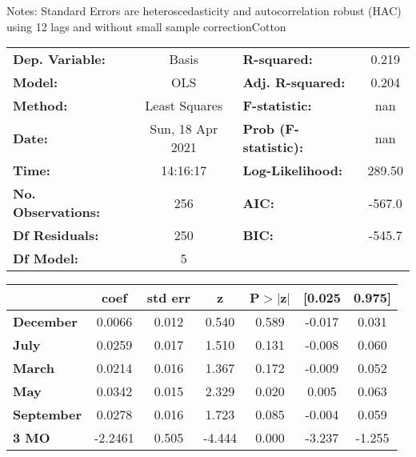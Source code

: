 Notes: \newline
 [1] Standard Errors are heteroscedasticity and autocorrelation robust (HAC) using 12 lags and without small sample correctionCotton\begin{center}
\begin{tabular}{lclc}
\toprule
\textbf{Dep. Variable:}    &      Basis       & \textbf{  R-squared:         } &     0.219   \\
\textbf{Model:}            &       OLS        & \textbf{  Adj. R-squared:    } &     0.204   \\
\textbf{Method:}           &  Least Squares   & \textbf{  F-statistic:       } &       nan   \\
\textbf{Date:}             & Sun, 18 Apr 2021 & \textbf{  Prob (F-statistic):} &      nan    \\
\textbf{Time:}             &     14:16:17     & \textbf{  Log-Likelihood:    } &    289.50   \\
\textbf{No. Observations:} &         256      & \textbf{  AIC:               } &    -567.0   \\
\textbf{Df Residuals:}     &         250      & \textbf{  BIC:               } &    -545.7   \\
\textbf{Df Model:}         &           5      & \textbf{                     } &             \\
\bottomrule
\end{tabular}
\begin{tabular}{lcccccc}
                   & \textbf{coef} & \textbf{std err} & \textbf{z} & \textbf{P$> |$z$|$} & \textbf{[0.025} & \textbf{0.975]}  \\
\midrule
\textbf{December}  &       0.0066  &        0.012     &     0.540  &         0.589        &       -0.017    &        0.031     \\
\textbf{July}      &       0.0259  &        0.017     &     1.510  &         0.131        &       -0.008    &        0.060     \\
\textbf{March}     &       0.0214  &        0.016     &     1.367  &         0.172        &       -0.009    &        0.052     \\
\textbf{May}       &       0.0342  &        0.015     &     2.329  &         0.020        &        0.005    &        0.063     \\
\textbf{September} &       0.0278  &        0.016     &     1.723  &         0.085        &       -0.004    &        0.059     \\
\textbf{3 MO}      &      -2.2461  &        0.505     &    -4.444  &         0.000        &       -3.237    &       -1.255     \\

\end{tabular}
\end{center}
